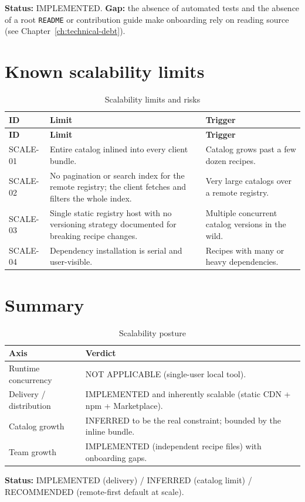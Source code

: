 \textbf{Status:} IMPLEMENTED. \textbf{Gap:} the absence of automated tests and
the absence of a root \texttt{README} or contribution guide make onboarding
rely on reading source (see Chapter~\ref{ch:technical-debt}).

\section{Known scalability limits}

\begin{longtable}{@{}L{1.5cm}L{9.3cm}L{3.3cm}@{}}
\caption{Scalability limits and risks}\\
\toprule
\textbf{ID} & \textbf{Limit} & \textbf{Trigger} \\
\midrule
\endfirsthead
\toprule
\textbf{ID} & \textbf{Limit} & \textbf{Trigger} \\
\midrule
\endhead
SCALE-01 & Entire catalog inlined into every client bundle. & Catalog grows past
a few dozen recipes. \\
SCALE-02 & No pagination or search index for the remote registry; the client
fetches and filters the whole index. & Very large catalogs over a remote
registry. \\
SCALE-03 & Single static registry host with no versioning strategy documented for
breaking recipe changes. & Multiple concurrent catalog versions in the wild. \\
SCALE-04 & Dependency installation is serial and user-visible. & Recipes with many
or heavy dependencies. \\
\bottomrule
\end{longtable}

\section{Summary}

\begin{table}[H]
\centering
\caption{Scalability posture}
\begin{tabular}{@{}L{4.4cm}L{9.8cm}@{}}
\toprule
\textbf{Axis} & \textbf{Verdict} \\
\midrule
Runtime concurrency & NOT APPLICABLE (single-user local tool). \\
Delivery / distribution & IMPLEMENTED and inherently scalable (static CDN + npm +
Marketplace). \\
Catalog growth & INFERRED to be the real constraint; bounded by the inline
bundle. \\
Team growth & IMPLEMENTED (independent recipe files) with onboarding gaps. \\
\bottomrule
\end{tabular}
\end{table}

\textbf{Status:} IMPLEMENTED (delivery) / INFERRED (catalog limit) / RECOMMENDED
(remote-first default at scale).
